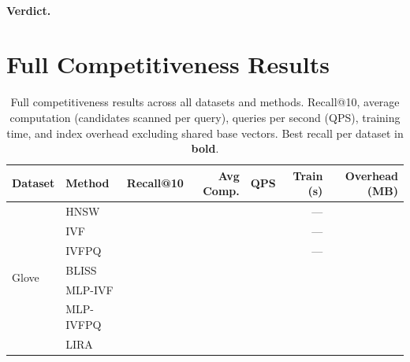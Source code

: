 \paragraph{Verdict.}


\section{Full Competitiveness Results}
\label{sec:appendix:full_comp}

\begin{table}[t]
\centering
\caption{Full competitiveness results across all datasets and methods.
         Recall@10, average computation (candidates scanned per query),
         queries per second (QPS), training time, and index overhead
         excluding shared base vectors.  Best recall per dataset in
         \textbf{bold}.}
\label{tab:appendix:full_comp}
\small
\begin{tabular}{llrrrrr}
\toprule
Dataset & Method & Recall@10 & Avg Comp. & QPS & Train (s) & Overhead (MB) \\
\midrule
\multirow{9}{*}{Glove}
 & HNSW          & \placeholder{\_\_\_} & \placeholder{\_\_\_} & \placeholder{\_\_\_} & ---                  & \placeholder{\_\_\_} \\
 & IVF           & \placeholder{\_\_\_} & \placeholder{\_\_\_} & \placeholder{\_\_\_} & ---                  & \placeholder{\_\_\_} \\
 & IVFPQ         & \placeholder{\_\_\_} & \placeholder{\_\_\_} & \placeholder{\_\_\_} & ---                  & \placeholder{\_\_\_} \\
 & BLISS         & \placeholder{\_\_\_} & \placeholder{\_\_\_} & \placeholder{\_\_\_} & \placeholder{\_\_\_} & \placeholder{\_\_\_} \\
 & MLP-IVF       & \placeholder{\_\_\_} & \placeholder{\_\_\_} & \placeholder{\_\_\_} & \placeholder{\_\_\_} & \placeholder{\_\_\_} \\
 & MLP-IVFPQ     & \placeholder{\_\_\_} & \placeholder{\_\_\_} & \placeholder{\_\_\_} & \placeholder{\_\_\_} & \placeholder{\_\_\_} \\
 & LIRA          & \placeholder{\_\_\_} & \placeholder{\_\_\_} & \placeholder{\_\_\_} & \placeholder{\_\_\_} & \placeholder{\_\_\_} \\

\end{tabular}
\end{table}
